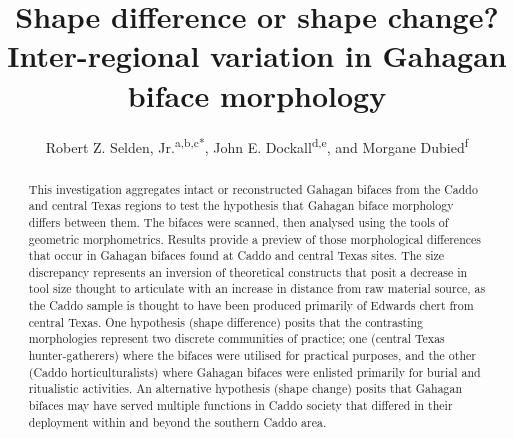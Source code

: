 \documentclass[review]{elsarticle}
\begin{document}
\begin{frontmatter}


\title{Shape difference or shape change? Inter-regional variation in Gahagan biface morphology}



\author{Robert Z. Selden, Jr.\textsuperscript{a,b,c*}, John E. Dockall\textsuperscript{d,e}, and Morgane Dubied\textsuperscript{f}}
\address[1]{Heritage Research Center, Stephen F. Austin State University, United States}
\address[2]{Cultural Heritage Department, Jean Monnet University, France}
\address[3]{ORCID ID \href{http://orcid.org/0000-0002-1789-8449}{0000-0002-1789-8449}}
\address[4]{Prewitt and Associates, Inc., United States}
\address[5]{ORCID ID \href{http://orcid.org/0000-0002-0940-7144}{0000-0002-0940-7144}}
\address[6]{UMR 6282, Laboratoire Biogéosciences, Université de Bourgogne, France}

\begin{abstract}
This investigation aggregates intact or reconstructed Gahagan bifaces from the Caddo and central Texas regions to test the hypothesis that Gahagan biface morphology differs between them. The bifaces were scanned, then analysed using the tools of geometric morphometrics. Results provide a preview of those morphological differences that occur in Gahagan bifaces found at Caddo and central Texas sites. The size discrepancy represents an inversion of theoretical constructs that posit a decrease in tool size thought to articulate with an increase in distance from raw material source, as the Caddo sample is thought to have been produced primarily of Edwards chert from central Texas. One hypothesis (shape difference) posits that the contrasting morphologies represent two discrete communities of practice; one (central Texas hunter-gatherers) where the bifaces were utilised for practical purposes, and the other (Caddo horticulturalists) where Gahagan bifaces were enlisted primarily for burial and ritualistic activities. An alternative hypothesis (shape change) posits that Gahagan bifaces may have served multiple functions in Caddo society that differed in their deployment within and beyond the southern Caddo area.
\end{abstract}


\end{frontmatter}
\end{document}
